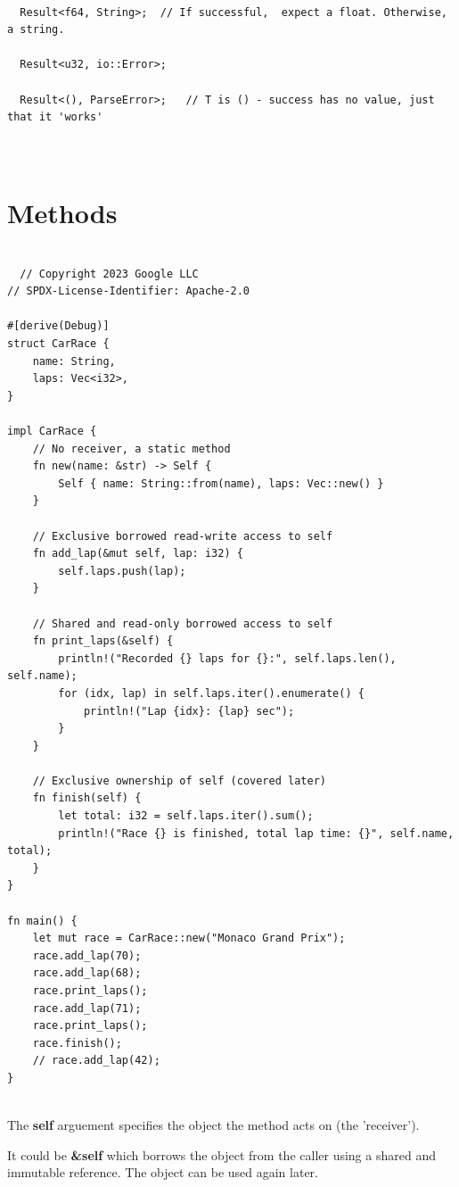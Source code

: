 \documentclass[11pt]{article}
\begin{document}
\begin{verbatim}

  Result<f64, String>;  // If successful,  expect a float. Otherwise, a string.

  Result<u32, io::Error>;

  Result<(), ParseError>;   // T is () - success has no value, just that it 'works'
  
                  
\end{verbatim}
\section{Methods}
\label{sec:org9abbf8b}

\begin{verbatim}

  // Copyright 2023 Google LLC
// SPDX-License-Identifier: Apache-2.0

#[derive(Debug)]
struct CarRace {
    name: String,
    laps: Vec<i32>,
}

impl CarRace {
    // No receiver, a static method
    fn new(name: &str) -> Self {
        Self { name: String::from(name), laps: Vec::new() }
    }

    // Exclusive borrowed read-write access to self
    fn add_lap(&mut self, lap: i32) {
        self.laps.push(lap);
    }

    // Shared and read-only borrowed access to self
    fn print_laps(&self) {
        println!("Recorded {} laps for {}:", self.laps.len(), self.name);
        for (idx, lap) in self.laps.iter().enumerate() {
            println!("Lap {idx}: {lap} sec");
        }
    }

    // Exclusive ownership of self (covered later)
    fn finish(self) {
        let total: i32 = self.laps.iter().sum();
        println!("Race {} is finished, total lap time: {}", self.name, total);
    }
}

fn main() {
    let mut race = CarRace::new("Monaco Grand Prix");
    race.add_lap(70);
    race.add_lap(68);
    race.print_laps();
    race.add_lap(71);
    race.print_laps();
    race.finish();
    // race.add_lap(42);
}


\end{verbatim}

The \textbf{self} arguement specifies the object the method acts on (the 'receiver').

It could be \textbf{\&self} which borrows the object from the caller using a shared and immutable reference. The object can be used again later.
\end{document}
